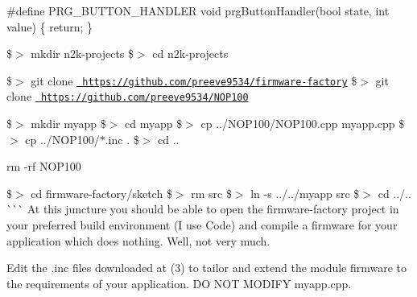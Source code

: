  \#define PRG\+\_\+\+BUTTON\+\_\+\+HANDLER void prg\+Button\+Handler(bool state, int value) \{ return; \} 
\begin{DoxyCode}{0}
\DoxyCodeLine{}

\end{DoxyCode}
 \$\texorpdfstring{$>$}{>} mkdir n2k-\/projects \$\texorpdfstring{$>$}{>} cd n2k-\/projects 
\begin{DoxyCode}{0}

\end{DoxyCode}
 \$\texorpdfstring{$>$}{>} git clone \href{https://github.com/preeve9534/firmware-factory}{\texttt{ https\+://github.\+com/preeve9534/firmware-\/factory}} \$\texorpdfstring{$>$}{>} git clone \href{https://github.com/preeve9534/NOP100}{\texttt{ https\+://github.\+com/preeve9534/\+NOP100}} 
\begin{DoxyCode}{0}

\end{DoxyCode}
 \$\texorpdfstring{$>$}{>} mkdir myapp \$\texorpdfstring{$>$}{>} cd myapp \$\texorpdfstring{$>$}{>} cp ../\+NOP100/\+NOP100.cpp myapp.\+cpp \$\texorpdfstring{$>$}{>} cp ../\+NOP100/$\ast$.inc . \$\texorpdfstring{$>$}{>} cd .. 
\begin{DoxyCode}{0}

\end{DoxyCode}
 rm -\/rf NOP100 
\begin{DoxyCode}{0}

\end{DoxyCode}
 \$\texorpdfstring{$>$}{>} cd firmware-\/factory/sketch \$\texorpdfstring{$>$}{>} rm src \$\texorpdfstring{$>$}{>} ln -\/s ../../myapp src \$\texorpdfstring{$>$}{>} cd ../.. \`{}\`{}\`{} At this juncture you should be able to open the firmware-\/factory project in your preferred build environment (I use Code) and compile a firmware for your application which does nothing. Well, not very much.
\begin{DoxyEnumerate}
\item Edit the {\ttfamily .inc} files downloaded at (3) to tailor and extend the module firmware to the requirements of your application. DO NOT MODIFY myapp.\+cpp. 
\end{DoxyEnumerate}